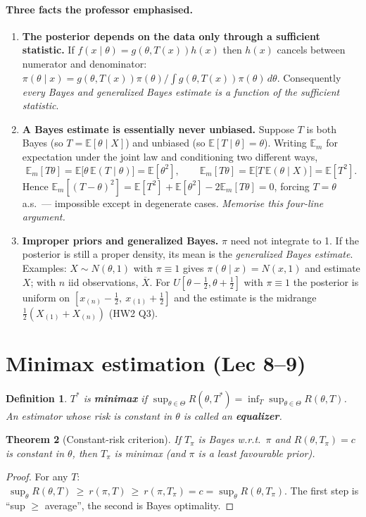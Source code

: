 \documentclass[11pt]{article}
\newtheorem{theorem}{Theorem}[section]
\newtheorem{definition}[theorem]{Definition}
\theoremstyle{remark}
\newcommand{\E}{\mathbb{E}}
\newcommand{\Xbar}{\overline{X}}
\begin{document}
\paragraph{Three facts the professor emphasised.}
\begin{enumerate}
\item \textbf{The posterior depends on the data only through a sufficient statistic.}
If $f(x\mid\theta)=g(\theta,T(x))h(x)$ then $h(x)$ cancels between numerator and denominator:
$\pi(\theta\mid x)=g(\theta,T(x))\pi(\theta)\big/\int g(\theta,T(x))\pi(\theta)\,d\theta$.
Consequently \emph{every Bayes and generalized Bayes estimate is a function of the sufficient
statistic}.
\item \textbf{A Bayes estimate is essentially never unbiased.} Suppose $T$ is both Bayes
(so $T=\E[\theta\mid X]$) and unbiased (so $\E[T\mid\theta]=\theta$). Writing $\E_m$ for
expectation under the joint law and conditioning two different ways,
\[
\E_m[T\theta]=\E\big[\theta\,\E(T\mid\theta)\big]=\E[\theta^2],\qquad
\E_m[T\theta]=\E\big[T\,\E(\theta\mid X)\big]=\E[T^2].
\]
Hence $\E_m[(T-\theta)^2]=\E[T^2]+\E[\theta^2]-2\E_m[T\theta]=0$, forcing $T=\theta$ a.s.\ ---
impossible except in degenerate cases. \emph{Memorise this four-line argument.}
\item \textbf{Improper priors and generalized Bayes.} $\pi$ need not integrate to 1. If the
posterior is still a proper density, its mean is the \emph{generalized Bayes estimate}.
Examples: $X\sim N(\theta,1)$ with $\pi\equiv1$ gives $\pi(\theta\mid x)=N(x,1)$ and estimate
$X$; with $n$ iid observations, $\Xbar$. For $U[\theta-\tfrac12,\theta+\tfrac12]$ with
$\pi\equiv1$ the posterior is uniform on $[x_{(n)}-\tfrac12,\ x_{(1)}+\tfrac12]$ and the
estimate is the midrange $\tfrac12(X_{(1)}+X_{(n)})$ (HW2 Q3).
\end{enumerate}

\section{Minimax estimation (Lec 8--9)}

\begin{definition}
$T^*$ is \textbf{minimax} if
$\displaystyle\sup_{\theta\in\Theta}R(\theta,T^*)=\inf_{T}\sup_{\theta\in\Theta}R(\theta,T)$.
An estimator whose risk is constant in $\theta$ is called an \textbf{equalizer}.
\end{definition}

\begin{theorem}[Constant-risk criterion]
If $T_\pi$ is Bayes w.r.t.\ $\pi$ and $R(\theta,T_\pi)=c$ is \emph{constant in $\theta$}, then
$T_\pi$ is minimax (and $\pi$ is a least favourable prior).
\end{theorem}
\begin{proof}
For any $T$: $\ \sup_\theta R(\theta,T)\ \ge\ r(\pi,T)\ \ge\ r(\pi,T_\pi)=c=\sup_\theta R(\theta,T_\pi)$.
The first step is ``sup $\ge$ average'', the second is Bayes optimality.
\end{proof}
\end{document}
